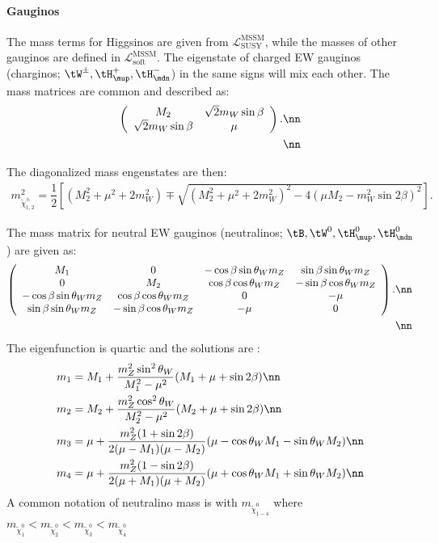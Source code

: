 \paragraph{Gauginos}
The mass terms for Higgsinos are given from $\mathcal{L}^{\mathrm{MSSM}}_{\mathrm{SUSY}}$, while the masses of other gauginos are defined in $\mathcal{L}^{\mathrm{MSSM}}_{\mathrm{soft}}$. The eigenstate of charged EW gauginos (charginos; $\tW^\pm, \tH^+_\mup, \tH^-_\mdn$) in the same signs will mix each other.
The mass matrices are common and described as:
\begin{align}
\left(  
  \begin{array}{cc}
    M_2                    &  \sqrt{2} m_W \sin{\beta} \\
    \sqrt{2} m_W \sin{\beta} &  \mu                    \\
  \end{array}
\right). \nn \\ \nn
\end{align}

The diagonalized mass engenstates are then:
\begin{align}
m_{\tilde{\chi}_{1,2}^{\pm}}^2 = \dfrac{1}{2} \left[ (M_2^2+\mu^2+2m_W^2) \mp \sqrt{(M_2^2+\mu^2+2m_W^2)^2 - 4(\mu M_2-m_W^2\sin2\beta)^2} \right].
\end{align}

The mass matrix for neutral EW gauginos (neutralinos; $\tB, \tW^0, \tH^0_\mup, \tH^0_\mdn$) are given as:
\begin{align}
\left(  
  \begin{array}{cccc}
    M_1                       &  0                         & -\cos\beta\sin\theta_W m_Z &  \sin\beta\sin\theta_W m_Z   \\
    0                         &  M_2                       &  \cos\beta\cos\theta_W m_Z & -\sin\beta\cos\theta_W m_Z   \\
   -\cos\beta\sin\theta_W m_Z &  \cos\beta\cos\theta_W m_Z &  0                         & -\mu                         \\
    \sin\beta\sin\theta_W m_Z & -\sin\beta\cos\theta_W m_Z & -\mu                       &  0                           \\
  \end{array}
\right). \nn \\ \nn
\end{align}
The eigenfunction is quartic and the solutions are :
\begin{align}
m_1 & = M_1 + \frac{m_Z^2\sin^2{\theta_W}}{M_1^2-\mu^2} (M_1 + \mu+\sin2\beta)   \nn \\
m_2 & = M_2 + \frac{m_Z^2\cos^2{\theta_W}}{M_2^2-\mu^2} (M_2 + \mu+\sin2\beta)   \nn \\
m_3 & = \mu + \frac{m_Z^2(1+\sin{2\beta})}{2(\mu-M_1)(\mu-M_2)} (\mu-\cos{\theta_W}M_1-\sin{\theta_W}M_2)  \nn \\
m_4 & = \mu + \frac{m_Z^2(1-\sin{2\beta})}{2(\mu+M_1)(\mu+M_2)} (\mu+\cos{\theta_W}M_1+\sin{\theta_W}M_2)  \nn \\
\end{align}
A common notation of neutralino mass is with
$m_{\tilde{\chi}_{1-4}^0}$ where $m_{\tilde{\chi}_{1}^0}<m_{\tilde{\chi}_{2}^0}<m_{\tilde{\chi}_{3}^0}<m_{\tilde{\chi}_{4}^0}$


